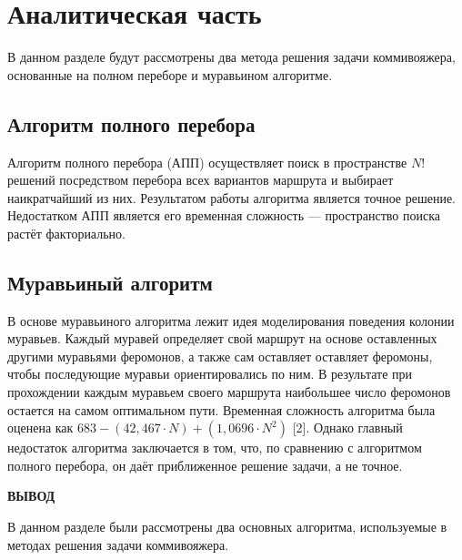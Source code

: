 \chapter{Аналитическая часть}

В данном разделе будут рассмотрены два метода решения задачи коммивояжера, основанные на полном переборе и муравьином алгоритме.

\section{Алгоритм полного перебора}

Алгоритм полного перебора (АПП) осуществляет поиск в пространстве $N!$ решений посредством перебора всех вариантов маршрута и выбирает наикратчайший из них. Результатом работы алгоритма является точное решение. Недостатком АПП является его временная сложность --- пространство поиска растёт факториально.

\section{Муравьиный алгоритм}

В основе муравьиного алгоритма лежит идея моделирования поведения колонии муравьев. Каждый муравей определяет свой маршрут на основе оставленных другими муравьями феромонов, а также сам оставляет оставляет феромоны, чтобы последующие муравьи ориентировались по ним. В результате при прохождении каждым муравьем своего маршрута наибольшее число феромонов остается на самом оптимальном пути. Временная сложность алгоритма была оценена как $683 - (42,467 · N) + (1,0696 · N^2)$ [2]. Однако главный недостаток алгоритма заключается в том, что, по сравнению с алгоритмом полного перебора, он даёт приближенное решение задачи, а не точное.

\vspace{5mm}

\textbf{ВЫВОД}

В данном разделе были рассмотрены два основных алгоритма, используемые в методах решения задачи коммивояжера.